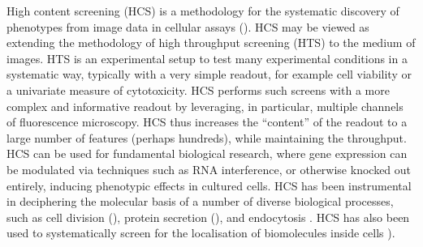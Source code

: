 High content screening (HCS) is a methodology for the systematic discovery of phenotypes from image data in cellular assays (\cite{haney2008high}). HCS may be viewed as extending the methodology of high throughput screening (HTS) to the medium of images. HTS is an experimental setup to test many experimental conditions in a systematic way, typically with a very simple readout, for example cell viability or a univariate measure of cytotoxicity. HCS performs such screens with a more complex and informative readout by leveraging, in particular, multiple channels of fluorescence microscopy. HCS thus increases the ``content'' of the readout to a large number of features (perhaps hundreds), while maintaining the throughput. HCS can be used for fundamental biological research, where gene expression can be modulated via techniques such as RNA interference, or otherwise knocked out entirely, inducing phenotypic effects in cultured cells. HCS has been instrumental in deciphering the molecular basis of a number of diverse biological processes, such as cell division (\cite{neumann2010phenotypic}), protein secretion (\cite{simpson2012genome}), and endocytosis \cite{collinet2010systems}. HCS has also been used to systematically screen for the localisation of biomolecules inside cells \cite{boland1998automated}).


